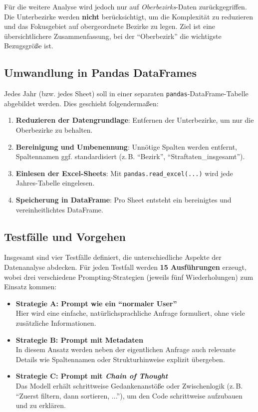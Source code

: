 \documentclass[11pt,a4paper]{article}
\begin{document}
Für die weitere Analyse wird jedoch nur auf \emph{Oberbezirks}-Daten zurückgegriffen. Die Unterbezirke werden \textbf{nicht} berücksichtigt, um die Komplexität zu reduzieren und das Fokusgebiet auf obergeordnete Bezirke zu legen. Ziel ist eine übersichtlichere Zusammenfassung, bei der \enquote{Oberbezirk} die wichtigste Bezugsgröße ist.

\subsection{Umwandlung in Pandas DataFrames}
Jedes Jahr (bzw. jedes Sheet) soll in einer separaten \texttt{pandas}-DataFrame-Tabelle abgebildet werden. Dies geschieht folgendermaßen:
\begin{enumerate}
    \item \textbf{Reduzieren der Datengrundlage}: Entfernen der Unterbezirke, um nur die Oberbezirke zu behalten.
    \item \textbf{Bereinigung und Umbenennung}: Unnötige Spalten werden entfernt, Spaltennamen ggf. standardisiert (z.\,B. \enquote{Bezirk}, \enquote{Straftaten\_insgesamt}).
    \item \textbf{Einlesen der Excel-Sheets}: Mit \texttt{pandas.read\_excel(...)} wird jede Jahres-Tabelle eingelesen.
    \item \textbf{Speicherung in DataFrame}: Pro Sheet entsteht ein bereinigtes und vereinheitlichtes DataFrame.
\end{enumerate}

\subsection{Testfälle und Vorgehen}
Insgesamt sind vier Testfälle definiert, die unterschiedliche Aspekte der Datenanalyse abdecken. Für jeden Testfall werden \textbf{15 Ausführungen} erzeugt, wobei drei verschiedene Prompting-Strategien (jeweils fünf Wiederholungen) zum Einsatz kommen:
\begin{itemize}
    \label{itemize:promptingstrategien}
    \item \textbf{Strategie A: Prompt wie ein \enquote{normaler User}}\\
    Hier wird eine einfache, natürlichsprachliche Anfrage formuliert, ohne viele zusätzliche Informationen.
    \item \textbf{Strategie B: Prompt mit Metadaten}\\
    In diesem Ansatz werden neben der eigentlichen Anfrage auch relevante Details wie Spaltennamen oder Strukturhinweise explizit übergeben.
    \item \textbf{Strategie C: Prompt mit \emph{Chain of Thought}}\\
    Das Modell erhält schrittweise Gedankenanstöße oder Zwischenlogik (z.\,B. \enquote{Zuerst filtern, dann sortieren, ...}), um den Code schrittweise aufzubauen und zu erklären.
\end{itemize}
\end{document}
